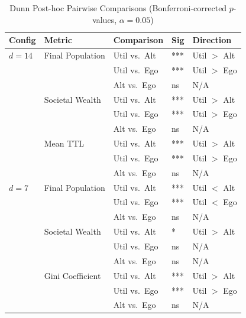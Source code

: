 \documentclass{icsthesis}
\begin{document}
\begin{mainmatter}
		\begin{table}[H]
		\vspace{2ex}
		\centering
		\caption{Dunn Post-hoc Pairwise Comparisons (Bonferroni-corrected $p$-values, $\alpha = 0.05$)}
		\label{table:app-dunn}
		\footnotesize
		\renewcommand{\arraystretch}{1.3}
		\begin{tabular}{
			>{\raggedright\arraybackslash}p{1.8cm}
			>{\raggedright\arraybackslash}p{3.2cm}
			>{\raggedright\arraybackslash}p{2.8cm}
			l l
		}
		\hline\hline
		\textbf{Config} & \textbf{Metric} & \textbf{Comparison} & \textbf{Sig} & \textbf{Direction} \\
		\hline
		$d = 14$ & Final Population    & Util vs.\ Alt & *** & Util $>$ Alt \\
		         &                     & Util vs.\ Ego & *** & Util $>$ Ego \\
		         &                     & Alt vs.\ Ego  & ns  & N/A          \\
		         & Societal Wealth     & Util vs.\ Alt & *** & Util $>$ Alt \\
		         &                     & Util vs.\ Ego & *** & Util $>$ Ego \\
		         &                     & Alt vs.\ Ego  & ns  & N/A          \\
		         & Mean TTL            & Util vs.\ Alt & *** & Util $>$ Alt \\
		         &                     & Util vs.\ Ego & *** & Util $>$ Ego \\
		         &                     & Alt vs.\ Ego  & ns  & N/A          \\
		\hline
		$d = 7$  & Final Population    & Util vs.\ Alt & *** & Util $<$ Alt \\
		         &                     & Util vs.\ Ego & *** & Util $<$ Ego \\
		         &                     & Alt vs.\ Ego  & ns  & N/A          \\
		         & Societal Wealth     & Util vs.\ Alt & *   & Util $>$ Alt \\
		         &                     & Util vs.\ Ego & ns  & N/A          \\
		         &                     & Alt vs.\ Ego  & ns  & N/A          \\
		         & Gini Coefficient    & Util vs.\ Alt & *** & Util $>$ Alt \\
		         &                     & Util vs.\ Ego & *** & Util $>$ Ego \\
		         &                     & Alt vs.\ Ego  & ns  & N/A          \\

\end{tabular}
\end{table}
\end{mainmatter}
\end{document}

